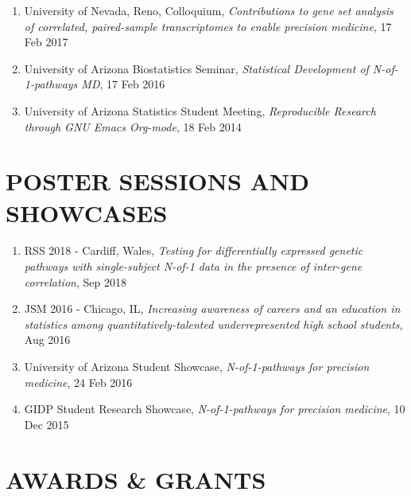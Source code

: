 \documentclass[paper=a4,fontsize=11pt]{scrartcl} %
\newcommand{\NewPart}[2]{\section*{\uppercase{#1} #2 }}
\newcommand{\TalkEntry}[4]{
		\noindent #1, #2, #3 #4}
\begin{document}
\begin{enumerate}
\item\TalkEntry{University of Nevada, Reno, Colloquium}{\textit{Contributions to gene set analysis of correlated, paired-sample transcriptomes to enable precision medicine}}{17 Feb 2017}{}

\item\TalkEntry{University of Arizona Biostatistics Seminar}{\textit{Statistical Development of N-of-1-pathways MD}}{17 Feb 2016}{}
\item\TalkEntry{University of Arizona Statistics Student Meeting}{\textit{Reproducible Research through GNU Emacs Org-mode}}{18 Feb 2014}{}
\vspace{-7pt}
\end{enumerate}

\NewPart{Poster sessions and Showcases}{}
\vspace{-7pt}
\begin{enumerate}
  \item\TalkEntry{RSS 2018 - Cardiff, Wales}{\textit{Testing for differentially expressed genetic pathways with single-subject N-of-1 data in the presence of inter-gene correlation}}{Sep 2018}{}
\item\TalkEntry{JSM 2016 - Chicago, IL}{\textit{Increasing awareness of careers and an education in statistics among quantitatively-talented underrepresented high school students}}{Aug 2016}{}
\item\TalkEntry{University of Arizona Student Showcase}{\textit{N-of-1-pathways for precision medicine}}{24 Feb 2016}{}
\item\TalkEntry{GIDP Student Research Showcase}{\textit{N-of-1-pathways for precision medicine}}{10 Dec 2015}{}
\vspace{-7pt}
\end{enumerate}


\NewPart{Awards \& Grants}{}
\vspace{-7pt}
\end{document}
